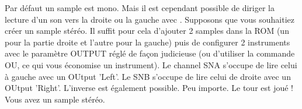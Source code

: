 \documentclass[12pt,a4paper]{article}
\begin{document}
    Par défaut un sample est mono. Mais il est cependant possible de diriger la lecture d'un son vers la droite ou la gauche avec \FAT.
    Supposons que vous souhaitiez créer un sample stéréo.
    Il suffit pour cela d'ajouter 2 samples dans la ROM (un pour la partie droite et l'autre pour la gauche) puis de configurer 2 instruments
    avec le paramètre OUTPUT réglé de façon judicieuse
     (ou d'utiliser la commande OU, ce qui vous économise un instrument).
    Le channel SNA s'occupe de lire celui à gauche avec un OUtput 'Left'.
    Le SNB s'occupe de lire celui de droite avec un OUtput 'Right'. L'inverse est également possible. Peu importe.
    Le tour est joué ! Vous avez un sample stéréo.
\end{document}
